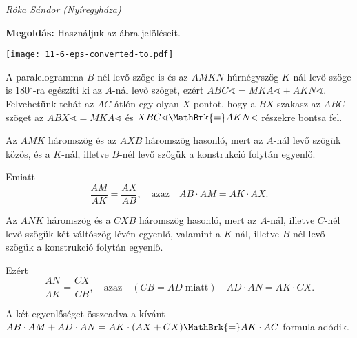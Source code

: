 \documentclass[a4paper,10pt]{article}
\newcommand{\ki}[2]{\hfill {\it #1 (#2)}\medskip}
\begin{document}
\ki{Róka Sándor}{Nyíregyháza}\medskip

\newpage
{\bf Megoldás:} Használjuk az ábra jelöléseit.

\begin{center}
\texttt{[image: 11-6-eps-converted-to.pdf]}
\end{center}

\noindent A paralelogramma $B$-nél levő szöge is és az $AMKN$ húrnégyszög $K$-nál levő szöge is $180^{\circ}$-ra egészíti ki az $A$-nál levő szöget, ezért $ABC\sphericalangle = MKA\sphericalangle + AKN\sphericalangle$. 
Felvehetünk tehát az $AC$ átlón egy olyan $X$ pontot, hogy a $BX$ szakasz az $ABC$ szöget az $ABX\sphericalangle = MKA\sphericalangle$ és $XBC\sphericalangle \MathBrk{=} AKN\sphericalangle$ részekre bontsa fel. 

\smallskip

\noindent Az $AMK$ háromszög és az $AXB$ háromszög hasonló, mert az $A$-nál levő szögük közös, és a $K$-nál, illetve $B$-nél levő szögük a konstrukció folytán egyenlő.

\smallskip

\noindent Emiatt 
\[\frac{AM}{AK}=\frac{AX}{AB},\quad\text{azaz}\quad AB\cdot AM=AK\cdot AX.\]

\noindent Az $ANK$ háromszög és a $CXB$ háromszög hasonló, mert az $A$-nál, illetve $C$-nél levő szögük két váltószög lévén egyenlő, valamint a $K$-nál, illetve $B$-nél levő szögük a konstrukció folytán egyenlő.

\smallskip

\noindent Ezért 
\[\frac{AN}{AK}=\frac{CX}{CB},\quad\text{azaz}\quad (CB=AD\;\text{miatt})\quad AD\cdot AN=AK\cdot CX.\]


\noindent A két egyenlőséget összeadva a kívánt $AB\cdot AM+AD\cdot AN=AK\cdot (AX+CX)\MathBrk{=}AK\cdot AC$ formula adódik.
\end{document}
